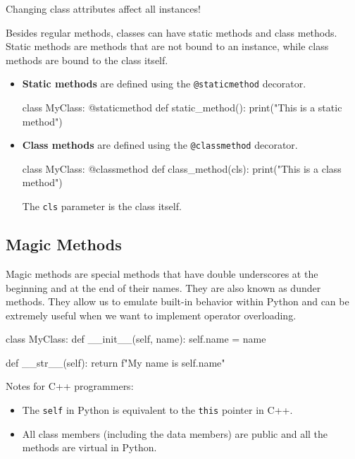 \begin{warningblock}
    Changing class attributes affect all instances!
\end{warningblock}

Besides regular methods, classes can have static methods and class methods. Static methods are methods that are not bound to an instance, while class methods are bound to the class itself.
\begin{itemize}
    \item \textbf{Static methods} are defined using the \texttt{@staticmethod} decorator.
    \begin{codeblock}[language=Python]
class MyClass:
    @staticmethod
    def static_method():
        print("This is a static method")
    \end{codeblock}
    \item \textbf{Class methods} are defined using the \texttt{@classmethod} decorator.
    \begin{codeblock}[language=Python]
class MyClass:
    @classmethod
    def class_method(cls):
        print("This is a class method")
    \end{codeblock}
    The \texttt{cls} parameter is the class itself.
\end{itemize}

\subsection*{Magic Methods}

Magic methods are special methods that have double underscores at the beginning and at the end of their names. They are also known as dunder methods. They allow us to emulate built-in behavior within Python and can be extremely useful when we want to implement operator overloading.

\begin{codeblock}[language=Python]
class MyClass:
    def __init__(self, name):
        self.name = name

    def __str__(self):
        return f"My name is {self.name}"
\end{codeblock}

\begin{observationblock}
    Notes for C++ programmers:
    \begin{itemize}
        \item The \texttt{self} in Python is equivalent to the \texttt{this} pointer in C++.
        \item All class members (including the data members) are public and all the methods are virtual in Python.
    \end{itemize}
\end{observationblock}


